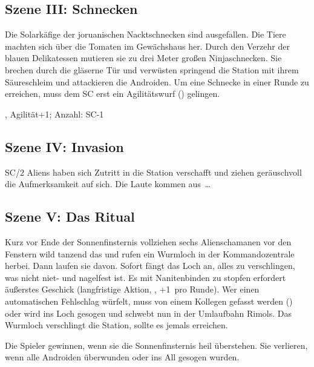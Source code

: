 {		

		\subsection{Szene III: Schnecken}

		\noindent
		Die Solarkäfige der joruanischen Nacktschnecken sind ausgefallen. Die Tiere machten sich über die Tomaten im Gewächshaus her. Durch den Verzehr der blauen Delikatessen mutieren sie zu drei Meter großen Ninjaschnecken. Sie brechen durch die gläserne Tür und verwüsten springend die Station mit ihrem Säureschleim und attackieren die Androiden. Um eine Schnecke in einer Runde zu erreichen, muss dem SC erst ein Agilitätswurf () gelingen.

		, Agilität+1; Anzahl: SC-1

		\subsection{Szene IV: Invasion}

		\noindent
		SC/2 Aliens haben sich Zutritt in die Station verschafft und ziehen geräuschvoll die Aufmerksamkeit auf sich. Die Laute kommen aus~\ldots


		\subsection{Szene V: Das Ritual}

		\noindent
		Kurz vor Ende der Sonnenfinsternis vollziehen sechs Alienschamanen vor den Fenstern wild tanzend das  und rufen ein Wurmloch in der Kommandozentrale herbei. Dann laufen sie davon. Sofort fängt das Loch an, alles zu verschlingen, was nicht niet- und nagelfest ist. Es mit Nanitenbinden zu stopfen erfordert äußerstes Geschick (langfristige Aktion, , +1\TN\ pro Runde). Wer einen automatischen Fehlschlag würfelt, muss von einem Kollegen gefasst werden () oder wird ins Loch gesogen und schwebt nun in der Umlaufbahn Rimols. Das Wurmloch verschlingt die Station, sollte es jemals  erreichen.


		\noindent
		Die Spieler gewinnen, wenn sie die Sonnenfinsternis heil überstehen. Sie verlieren, wenn alle Androiden überwunden oder ins All gesogen wurden.
}
